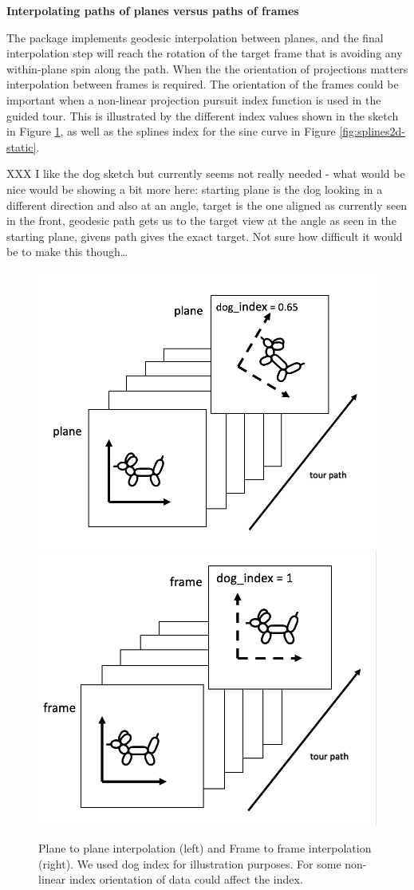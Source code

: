 \textbf{Interpolating paths of planes versus paths of frames}

The  package implements geodesic interpolation between
planes, and the final interpolation step will reach the rotation of the
target frame that is avoiding any within-plane spin along the path. When
the the orientation of projections matters interpolation between frames
is required. The orientation of the frames could be important when a
non-linear projection pursuit index function is used in the guided tour.
This is illustrated by the different index values shown in the sketch in
Figure \ref{fig:dogs}, as well as the splines index for the sine curve
in Figure \ref{fig:splines2d-static}.

XXX I like the dog sketch but currently seems not really needed - what
would be nice would be showing a bit more here: starting plane is the
dog looking in a different direction and also at an angle, target is the
one aligned as currently seen in the front, geodesic path gets us to the
target view at the angle as seen in the starting plane, givens path
gives the exact target. Not sure how difficult it would be to make this
though\ldots{}

\begin{Schunk}
\begin{figure}

{\centering \includegraphics[width=0.45\linewidth]{plane} \includegraphics[width=0.45\linewidth]{frame} 

}

\caption[Plane to plane interpolation (left) and Frame to frame interpolation (right)]{Plane to plane interpolation (left) and Frame to frame interpolation (right). We used dog index for illustration purposes. For some non-linear index orientation of data could affect the index.}\label{fig:dogs}
\end{figure}
\end{Schunk}


